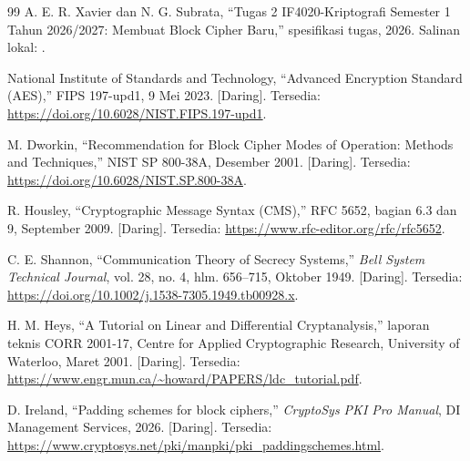 \clearpage{}
{}
\begin{thebibliography}{99}
A. E. R. Xavier dan N. G. Subrata,
``Tugas 2 IF4020-Kriptografi Semester 1 Tahun 2026/2027:
Membuat Block Cipher Baru,'' spesifikasi tugas, 2026.
Salinan lokal: .

National Institute of Standards and Technology,
``Advanced Encryption Standard (AES),'' FIPS 197-upd1,
9 Mei 2023. [Daring]. Tersedia:
\url{https://doi.org/10.6028/NIST.FIPS.197-upd1}.

M. Dworkin, ``Recommendation for Block Cipher Modes of Operation:
Methods and Techniques,'' NIST SP 800-38A, Desember 2001.
[Daring]. Tersedia: \url{https://doi.org/10.6028/NIST.SP.800-38A}.

R. Housley, ``Cryptographic Message Syntax (CMS),'' RFC 5652,
bagian 6.3 dan 9, September 2009. [Daring]. Tersedia:
\url{https://www.rfc-editor.org/rfc/rfc5652}.

C. E. Shannon, ``Communication Theory of Secrecy Systems,''
\textit{Bell System Technical Journal}, vol. 28, no. 4,
hlm. 656--715, Oktober 1949. [Daring]. Tersedia:
\url{https://doi.org/10.1002/j.1538-7305.1949.tb00928.x}.

H. M. Heys, ``A Tutorial on Linear and Differential Cryptanalysis,''
laporan teknis CORR 2001-17, Centre for Applied Cryptographic Research,
University of Waterloo, Maret 2001. [Daring]. Tersedia:
\url{https://www.engr.mun.ca/~howard/PAPERS/ldc_tutorial.pdf}.

D. Ireland, ``Padding schemes for block ciphers,''
\textit{CryptoSys PKI Pro Manual}, DI Management Services,
2026. [Daring]. Tersedia:
\url{https://www.cryptosys.net/pki/manpki/pki_paddingschemes.html}.
\end{thebibliography}

